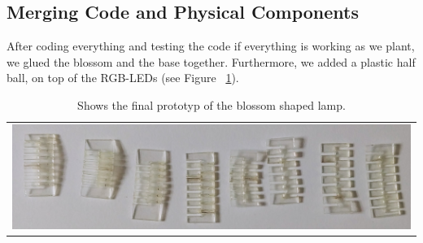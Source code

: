 \documentclass[00_doc.tex]{subfiles}
\begin{document}
    \subsection{Merging Code and Physical Components}
    \begin{flushleft}
        After coding everything and testing the code if everything is working as we plant, we glued
        the blossom and the base together. Furthermore, we added a plastic half ball, on top of the 
        RGB-LEDs (see Figure ~\ref{fig:finalPrototyp}).
    \end{flushleft}

    \begin{table}[h!]
        \centering
        \begin{tabular}{c}
        \centering
        \includegraphics[width=.8\linewidth]{images/process/01_LaserCut.jpg}
        \end{tabular}
        \caption{Shows the final prototyp of the blossom shaped lamp.}
        \label{fig:finalPrototyp}
    \end{table}
\end{document}
